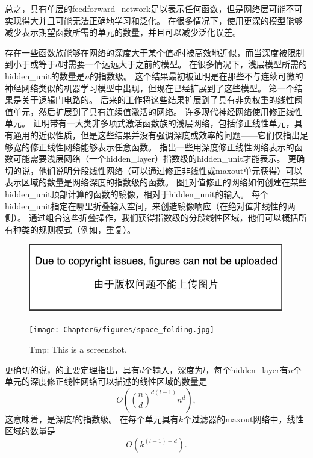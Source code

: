 总之，具有单层的\gls{feedforward_network}足以表示任何函数，但是网络层可能不可实现得大并且可能无法正确地学习和泛化。
在很多情况下，使用更深的模型能够减少表示期望函数所需的单元的数量，并且可以减少泛化误差。


存在一些函数族能够在网络的深度大于某个值$d$时被高效地近似，而当深度被限制到小于或等于$d$时需要一个远远大于之前的模型。
在很多情况下，浅层模型所需的\gls{hidden_unit}的数量是$n$的指数级。
这个结果最初被证明是在那些不与连续可微的神经网络类似的机器学习模型中出现，但现在已经扩展到了这些模型。
第一个结果是关于逻辑门电路的\citep{Hastad86}。
后来的工作将这些结果扩展到了具有非负权重的线性阈值单元\citep{Hastad91,Hajnal-et-al-1993}，然后扩展到了具有连续值激活的网络\citep{Maass-1992,Maass-et-al-1994}。
许多现代神经网络使用修正线性单元。
\cite{Leshno-et-al-1993}证明带有一大类非多项式激活函数族的浅层网络，包括修正线性单元，具有通用的近似性质，但是这些结果并没有强调深度或效率的问题——它们仅指出足够宽的修正线性网络能够表示任意函数。
\cite{Montufar-et-al-NIPS2014}指出一些用深度修正线性网络表示的函数可能需要浅层网络（一个\gls{hidden_layer}）指数级的\gls{hidden_unit}才能表示。
更确切的说，他们说明分段线性网络（可以通过修正非线性或maxout单元获得）可以表示区域的数量是网络深度的指数级的函数。
图\ref{fig:chap6_space_folding}对值修正的网络如何创建在某些\gls{hidden_unit}顶部计算的函数的镜像，相对于\gls{hidden_unit}的输入。
每个\gls{hidden_unit}指定在哪里折叠输入空间，来创造镜像响应（在绝对值非线性的两侧）。
通过组合这些折叠操作，我们获得指数级的分段线性区域，他们可以概括所有种类的规则模式（例如，重复）。
\begin{figure}[!htb]
\ifOpenSource
\centerline{\includegraphics{figure.pdf}}
\else
\centerline{\texttt{[image: Chapter6/figures/space\_folding.jpg]}}
\fi
\caption{Tmp: This is a screenshot.}
\label{fig:chap6_space_folding}
\end{figure}


更确切的说，\cite{Montufar-et-al-NIPS2014}的主要定理指出，具有$d$个输入，深度为$l$，每个\gls{hidden_layer}有$n$个单元的深度修正线性网络可以描述的线性区域的数量是
\begin{equation}
O \left ( {n \choose d}^{d(l-1)} n^d \right ),
\end{equation}
这意味着，是深度$l$的指数级。
在每个单元具有$k$个过滤器的maxout网络中，线性区域的数量是
\begin{equation}
O \left ( k^{(l-1)+d} \right ).
\end{equation}

